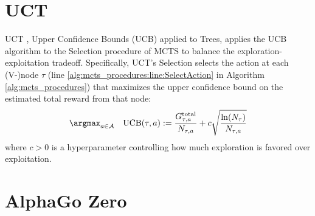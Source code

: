 \newpage\clearpage
\section{UCT}
\label{sec:UCT}
UCT \cite{uct}, Upper Confidence Bounds (UCB) applied to Trees, applies the UCB algorithm \cite{ucb} to the Selection procedure of MCTS to balance the exploration-exploitation tradeoff.
Specifically, UCT's Selection selects the action at each (V-)node $\tau$ (line \ref{alg:mcts_procedures:line:SelectAction} in Algorithm \ref{alg:mcts_procedures}) that maximizes the upper confidence bound on the estimated total reward from that node:
\begin{align*}
    \argmax_{a\in\mathcal{A}} \quad {\rm UCB}(\tau,a):= \frac{G^{\rm total}_{\tau,a}}{N_{\tau,a}} + c\sqrt{\frac{\ln(N_\tau)}{N_{\tau,a}}}
\end{align*}
where $c>0$ is a hyperparameter controlling how much exploration is favored over exploitation. 

\section{AlphaGo Zero}
\label{sec:AlphaGo Zero}


